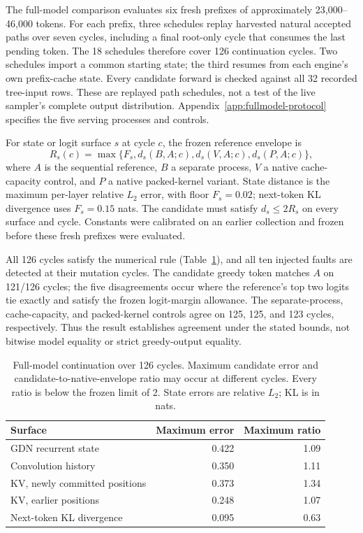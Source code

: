 The full-model comparison evaluates six fresh prefixes of approximately 23,000--46,000 tokens. For each prefix, three schedules replay harvested natural accepted paths over seven cycles, including a final root-only cycle that consumes the last pending token. The 18 schedules therefore cover 126 continuation cycles. Two schedules import a common starting state; the third resumes from each engine's own prefix-cache state. Every candidate forward is checked against all 32 recorded tree-input rows. These are replayed path schedules, not a test of the live sampler's complete output distribution. Appendix~\ref{app:fullmodel-protocol} specifies the five serving processes and controls.

For state or logit surface $s$ at cycle $c$, the frozen reference envelope is
\begin{equation}
 R_s(c)=\max\{F_s,d_s(B,A;c),d_s(V,A;c),d_s(P,A;c)\},
\end{equation}
where $A$ is the sequential reference, $B$ a separate process, $V$ a native cache-capacity control, and $P$ a native packed-kernel variant. State distance is the maximum per-layer relative $L_2$ error, with floor $F_s=0.02$; next-token KL divergence uses $F_s=0.15$ nats. The candidate must satisfy $d_s\leq2R_s$ on every surface and cycle. Constants were calibrated on an earlier collection and frozen before these fresh prefixes were evaluated.

All 126 cycles satisfy the numerical rule (Table~\ref{tab:fullmodel-agreement}), and all ten injected faults are detected at their mutation cycles. The candidate greedy token matches $A$ on 121/126 cycles; the five disagreements occur where the reference's top two logits tie exactly and satisfy the frozen logit-margin allowance. The separate-process, cache-capacity, and packed-kernel controls agree on 125, 125, and 123 cycles, respectively. Thus the result establishes agreement under the stated bounds, not bitwise model equality or strict greedy-output equality.

\begin{table}[t]
\caption{Full-model continuation over 126 cycles. Maximum candidate error and candidate-to-native-envelope ratio may occur at different cycles. Every ratio is below the frozen limit of 2. State errors are relative $L_2$; KL is in nats.}
\label{tab:fullmodel-agreement}
\centering\small
\setlength{\tabcolsep}{4pt}
\begin{tabular}{@{}lrr@{}}
\toprule
Surface & Maximum error & Maximum ratio \\
\midrule
GDN recurrent state & 0.422 & 1.09 \\
Convolution history & 0.350 & 1.11 \\
KV, newly committed positions & 0.373 & 1.34 \\
KV, earlier positions & 0.248 & 1.07 \\
Next-token KL divergence & 0.095 & 0.63 \\
\bottomrule
\end{tabular}
\end{table}

